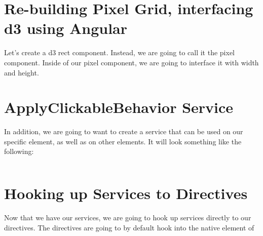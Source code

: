 \section{ Re-building Pixel Grid, interfacing d3 using Angular }
Let's create a d3 rect component. Instead, we are going to call it the pixel
component. Inside of our pixel component, we are going to interface it with
width and height.

\section{ ApplyClickableBehavior Service }
In addition, we are going to want to create a service that can be used on our
specific element, as well as on other elements. It will look something like
the following:
\begin{lstlisting}

\end{lstlisting}

\section{ Hooking up Services to Directives }
Now that we have our services, we are going to hook up services directly to
our directives. The directives are going to by default hook into the native
element of
